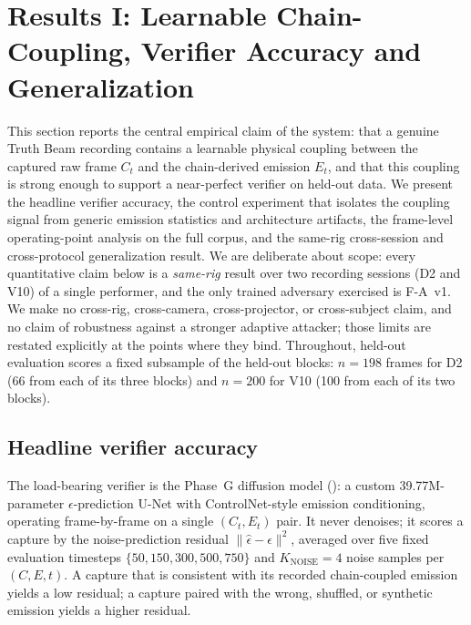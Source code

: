 \section{Results I: Learnable Chain-Coupling, Verifier Accuracy and Generalization}
\label{sec:results_main}

This section reports the central empirical claim of the system: that a genuine
Truth Beam recording contains a learnable physical coupling between the captured
raw frame $C_t$ and the chain-derived emission $E_t$, and that this coupling is
strong enough to support a near-perfect verifier on held-out data. We present
the headline verifier accuracy, the control experiment that isolates the
coupling signal from generic emission statistics and architecture artifacts, the
frame-level operating-point analysis on the full corpus, and the same-rig
cross-session and cross-protocol generalization result. We are deliberate about
scope: every quantitative claim below is a \emph{same-rig} result over two
recording sessions (D2 and V10) of a single performer, and the only trained
adversary exercised is F-A~v1. We make no cross-rig,
cross-camera, cross-projector, or cross-subject claim, and no claim of
robustness against a stronger adaptive attacker; those limits are restated
explicitly at the points where they bind. Throughout, held-out evaluation
scores a fixed subsample of the held-out blocks: $n=198$ frames for D2
(66 from each of its three blocks) and $n=200$ for V10 (100 from each of
its two blocks).

\subsection{Headline verifier accuracy}
\label{sec:results_main_headline}

The load-bearing verifier is the Phase~G diffusion model ():
a custom \num{39.77}M-parameter $\epsilon$-prediction U-Net with ControlNet-style
emission conditioning, operating frame-by-frame on a single $(C_t, E_t)$ pair.
It never denoises; it scores a capture by the noise-prediction residual
$\lVert \hat{\epsilon}-\epsilon\rVert^2$, averaged over five fixed evaluation
timesteps $\{50,150,300,500,750\}$ and $K_{\text{NOISE}}=4$ noise samples per
$(C,E,t)$. A capture that is consistent with its recorded chain-coupled emission
yields a low residual; a capture paired with the wrong, shuffled, or synthetic
emission yields a higher residual.

